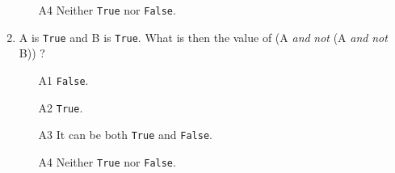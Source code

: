 \begin{enumerate}
\begin{enumerate}
\item[A4] Neither {\tt True} nor {\tt False}.
\end{enumerate}
\item A is {\tt True} and B is {\tt True}. What is then the value of (A {\em and} {\em not} (A {\em and} {\em not} B)) ?
\begin{enumerate}
\item[A1] {\tt False}.
\item[A2] {\tt True}.
\item[A3] It can be both {\tt True} and {\tt False}.
\item[A4] Neither {\tt True} nor {\tt False}.
\end{enumerate}
\end{enumerate}




